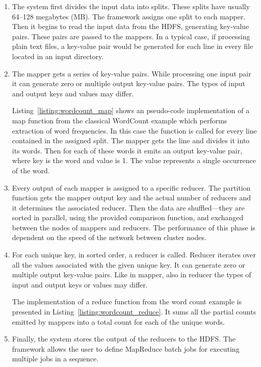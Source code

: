 \begin{enumerate}
	\item The system first divides the input data into splits. These splits have usually 64--128 megabytes (MB). The framework assigns one split to each mapper. Then it begins to read the input data from the HDFS, generating key-value pairs. These pairs are passed to the mappers. In a typical case, if processing plain text files, a key-value pair would be generated for each line in every file located in an input directory.
	
	\item The mapper gets a series of key-value pairs. While processing one input pair it can generate zero or multiple output key-value pairs. The types of input and output keys and values may differ. 
	
	Listing~\ref{listing:wordcount_map} shows an pseudo-code implementation of a map function from the classical WordCount example which performs extraction of word frequencies. In this case the function is called for every line contained in the assigned split. The mapper gets the line and divides it into its words. Then for each of these words it emits an output key-value pair, where key is the word and value is 1. The value represents a single occurrence of the word.

	\item Every output of each mapper is assigned to a specific reducer. The partition function gets the mapper output key and the actual number of reducers and it determines the associated reducer. Then the data are shuffled---they are sorted in parallel, using the provided comparison function, and exchanged between the nodes of mappers and reducers. The performance of this phase is dependent on the speed of the network between cluster nodes.
	
	\item For each unique key, in sorted order, a reducer is called. Reducer iterates over all the values associated with the given unique key. It can generate zero or multiple output key-value pairs. Like in mapper, also in reducer the types of input and output keys or values may differ.
	
	The implementation of a reduce function from the word count example is presented in Listing~\ref{listing:wordcount_reduce}. It sums all the partial counts emitted by mappers into a total count for each of the unique words.
	
	\item Finally, the system stores the output of the reducers to the HDFS. The framework allows the user to define MapReduce batch jobs for executing multiple jobs in a sequence.
\end{enumerate}

